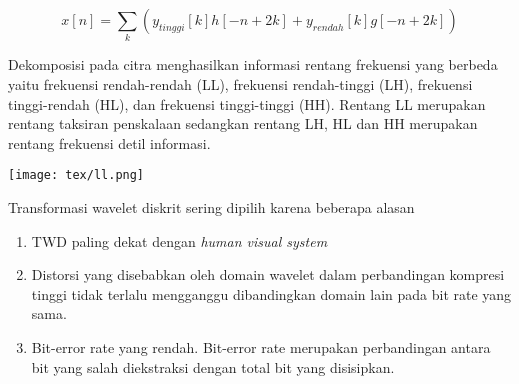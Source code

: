 \documentclass[laporan.tex]{subfiles}
\begin{document}
\begin{equation}
x[n]=\sum_k (y_{tinggi}[k]h[-n+2k]+y_{rendah}[k]g[-n+2k])
\end{equation}

Dekomposisi pada citra menghasilkan informasi rentang frekuensi yang berbeda yaitu frekuensi rendah-rendah (LL), frekuensi rendah-tinggi (LH), frekuensi tinggi-rendah (HL), dan frekuensi tinggi-tinggi (HH). Rentang LL merupakan rentang taksiran penskalaan sedangkan rentang LH, HL dan HH merupakan rentang frekuensi detil informasi.

\texttt{[image: tex/ll.png]}

Transformasi wavelet diskrit sering dipilih karena beberapa alasan

\begin{enumerate}
\item TWD paling dekat dengan \emph{human visual system}
\item Distorsi yang disebabkan oleh domain wavelet dalam perbandingan kompresi tinggi tidak terlalu mengganggu dibandingkan domain lain pada bit rate yang sama.
\item Bit-error rate yang rendah. Bit-error rate merupakan perbandingan antara bit yang salah diekstraksi dengan total bit yang disisipkan.
\end{enumerate}

\end{document}
